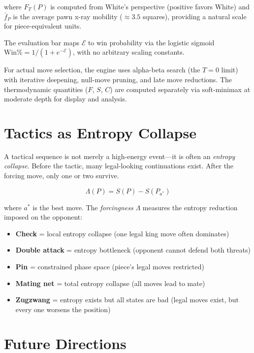\documentclass[11pt,a4paper]{article}
\begin{document}
where $F_T(P)$ is computed from White's perspective (positive favors
White) and $\bar{f}_P$ is the average pawn x-ray mobility ($\approx 3.5$
squares), providing a natural scale for piece-equivalent units.

The evaluation bar maps $\mathcal{E}$ to win probability via the logistic
sigmoid $\text{Win\%} = 1/(1 + e^{-\mathcal{E}})$, with no arbitrary
scaling constants.

For actual move selection, the engine uses alpha-beta search (the $T = 0$
limit) with iterative deepening, null-move pruning, and late move
reductions. The thermodynamic quantities ($F$, $S$, $C$) are computed
separately via soft-minimax at moderate depth for display and analysis.

\section{Tactics as Entropy Collapse}

A tactical sequence is not merely a high-energy event---it is often an
\emph{entropy collapse}. Before the tactic, many legal-looking
continuations exist. After the forcing move, only one or two survive.

\begin{equation}
\Lambda(P) = S(P) - S(P_{a^*})
\end{equation}

where $a^*$ is the best move. The \emph{forcingness} $\Lambda$ measures
the entropy reduction imposed on the opponent:

\begin{itemize}[nosep]
\item \textbf{Check} = local entropy collapse (one legal king move often
  dominates)
\item \textbf{Double attack} = entropy bottleneck (opponent cannot defend
  both threats)
\item \textbf{Pin} = constrained phase space (piece's legal moves
  restricted)
\item \textbf{Mating net} = total entropy collapse (all moves lead to
  mate)
\item \textbf{Zugzwang} = entropy exists but all states are bad (legal
  moves exist, but every one worsens the position)
\end{itemize}

\section{Future Directions}
\end{document}

